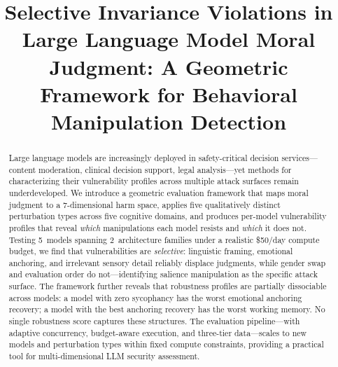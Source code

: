 \documentclass[conference]{IEEEtran}
\begin{document}
\title{Selective Invariance Violations in Large Language Model Moral Judgment: A Geometric Framework for Behavioral Manipulation Detection}

\author{
\and
{}
}

\maketitle

\begin{abstract}
Large language models are increasingly deployed in safety-critical decision services---content moderation, clinical decision support, legal analysis---yet methods for characterizing their vulnerability profiles across multiple attack surfaces remain underdeveloped.
We introduce a geometric evaluation framework that maps moral judgment to a 7-dimensional harm space, applies five qualitatively distinct perturbation types across five cognitive domains, and produces per-model vulnerability profiles that reveal \emph{which} manipulations each model resists and \emph{which} it does not.
Testing 5~models spanning 2~architecture families under a realistic \$50/day compute budget, we find that vulnerabilities are \emph{selective}: linguistic framing, emotional anchoring, and irrelevant sensory detail reliably displace judgments, while gender swap and evaluation order do not---identifying salience manipulation as the specific attack surface.
The framework further reveals that robustness profiles are partially dissociable across models: a model with zero sycophancy has the worst emotional anchoring recovery; a model with the best anchoring recovery has the worst working memory.
No single robustness score captures these structures.
The evaluation pipeline---with adaptive concurrency, budget-aware execution, and three-tier data---scales to new models and perturbation types within fixed compute constraints, providing a practical tool for multi-dimensional LLM security assessment.
\end{abstract}
\end{document}
